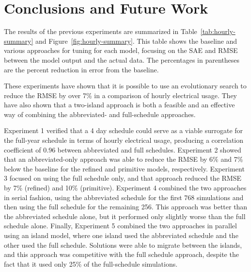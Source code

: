 \documentclass[preprint, review, 12pt]{elsarticle}
\begin{document}
{\section{Conclusions and Future Work}
\label{sec:conclusions}
The results of the previous experiments are summarized in Table~\ref{tab:hourly-summary} and Figure~\ref{fig:hourly-summary}. This table shows the baseline and various approaches for tuning for each model, focusing on the SAE and RMSE between the model output and the actual data. The percentages in parentheses are the percent reduction in error from the baseline.

These experiments have shown that it is possible to use an evolutionary search to reduce the RMSE by over 7\% in a  comparison of hourly electrical usage. They have also shown that a two-island approach is both a feasible and an effective way of combining the abbreviated- and full-schedule approaches. 

Experiment 1 verified that a 4 day schedule could serve as a viable surrogate for the full-year schedule in terms of hourly electrical usage, producing a correlation coefficient of 0.96 between abbreviated and full schedules. Experiment 2 showed that an abbreviated-only approach was able to reduce the RMSE by 6\% and 7\% below the baseline for the refined and primitive models, respectively. Experiment 3 focused on using the full schedule only, and that approach reduced the RMSE by 7\% (refined) and 10\% (primitive). Experiment 4 combined the two approaches in serial fashion, using the abbreviated schedule for the first 768 simulations and then using the full schedule for the remaining 256. This approach was better than the abbreviated schedule alone, but it performed only slightly worse than the full schedule alone. Finally, Experiment 5 combined the two approaches in parallel using an island model, where one island used the abbreviated schedule and the other used the full schedule. Solutions were able to migrate between the islands, and this approach was competitive with the full schedule approach, despite the fact that it used only 25\% of the full-schedule simulations.


}
\end{document}
